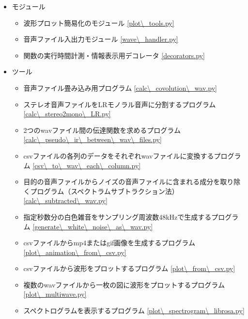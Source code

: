 \begin{itemize}
\tightlist
\item
  モジュール

  \begin{itemize}
  \item
    波形プロット簡易化のモジュール \ref{plot\_tools.py}

  \item
    音声ファイル入出力モジュール  \ref{wave\_handler.py}

  \item
    関数の実行時間計測・情報表示用デコレータ \ref{decorators.py}

  \end{itemize}

\item
  ツール

  \begin{itemize}
  \item
    音声ファイル畳み込み用プログラム \ref{calc\_covolution\_wav.py}

  \item
    ステレオ音声ファイルをLRモノラル音声に分割するプログラム \ref{calc\_stereo2mono\_LR.py}

  \item
    2つのwavファイル間の伝達関数を求めるプログラム \ref{calc\_pseudo\_ir\_between\_wav\_files.py}

  \item
    csvファイルの各列のデータをそれぞれwavファイルに変換するプログラム \ref{csv\_to\_wav\_each\_column.py}

  \item
    目的の音声ファイルからノイズの音声ファイルに含まれる成分を取り除くプログラム（スペクトラムサブトラクション法） \ref{calc\_subtracted\_wav.py}

  \item
    指定秒数分の白色雑音をサンプリング周波数48kHzで生成するプログラム \ref{generate\_white\_noise\_as\_wav.py}

  \item
    csvファイルからmp4またはgif画像を生成するプログラム \ref{plot\_animation\_from\_csv.py}

  \item
    csvファイルから波形をプロットするプログラム \ref{plot\_from\_csv.py}

  \item
    複数のwavファイルから一枚の図に波形をプロットするプログラム \ref{plot\_multiwave.py}

  \item
    スペクトログラムを表示するプログラム \ref{plot\_spectrogram\_librosa.py}

  \end{itemize}
\end{itemize}

